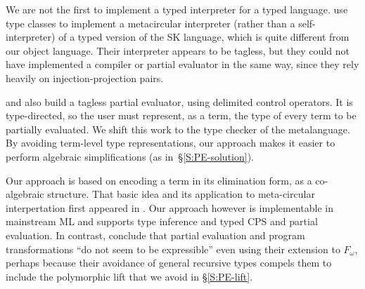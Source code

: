 We are not the first to implement a typed interpreter for a typed
language.   use type classes to implement a metacircular
interpreter (rather than a self\hyp interpreter) of a
typed version of the SK language, which is quite different from our
object language.  Their interpreter
appears to be tagless, but they could not have implemented a
compiler or partial evaluator in the same way, since they rely
heavily on injection\hyp projection pairs.

 and \citet{balat:tdpe-popl2004} also build
a tagless partial evaluator, using delimited control operators.  It is
type-directed, so the user must represent, as a term, the type of every
term to be partially evaluated.  We shift this work to the type checker
of the metalanguage.  By avoiding term-level type representations, our
approach makes it easier to perform algebraic simplifications (as
in~\S\ref{S:PE-solution}).


Our approach is based on encoding a term in its elimination form, as a
co-algebraic structure. That basic idea and its application to
meta-circular interpertation first appeared in \citet{Pfenning-Lee}.
Our approach however is implementable in mainstream ML and supports
type inference and typed CPS and partial evaluation. In contrast,
\cite{Pfenning-Lee} conclude that partial evaluation and program
transformations ``do not seem to be expressible'' even using their
extension to $F_{\omega}$, perhaps because their avoidance of general
recursive types compels them to include the polymorphic lift that we
avoid in \S\ref{S:PE-lift}.
\begin{comment}
It seems that Pfenning and Lee embed $F_2$ with type constructions in 
(pure) $F_3$.  We embed $F_1$ in (weak?) $F_2$, as I see it.  In a way, what 
we do is very similar to what they do (Figure 1, p.152), except that we 
do it in standard programming languges.  It is unclear if their work can 
be implemented (yet) in any language.  And we preserve type-inference, 
while their solution needs explcit types!
The following line of their conclusion is worth citing: "... this does 
not imply that the same language is also suitable for type 
metaprogramming. ... such as partial evaluation... do not seem to be 
expressible".
I suspect you're right, but I'm still reading the paper.  See also page
146: "for a term M in $F_1$ (a simply-typed term), the representation
$\bar{M}$ will be in $F_2$".  The move from $F_2$ to $F_3$ 
and beyond reminds me
strongly of our attempts at self-interpretation without the notion of a
syntactic hole.
\end{comment}

